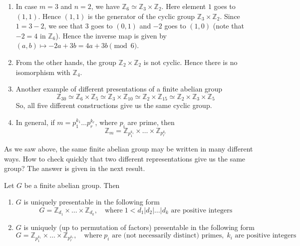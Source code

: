 \begin{examples}
\begin{enumerate}
\item In case $m = 3$ and $n = 2$, we have $\mathbb Z_6\simeq \mathbb Z_3\times\mathbb Z_2$.
Here element $1$ goes to $(1, 1)$.
Hence $(1, 1)$ is the generator of the cyclic group $\mathbb Z_3\times \mathbb Z_2$.
Since $1 = 3 - 2$, we see that $3$ goes to $(0, 1)$ and $-2$ goes to $(1,0)$  (note that $- 2 = 4$ in $\mathbb Z_6$).
Hence the inverse map is given by $(a, b)\mapsto -2a + 3b = 4a + 3b\pmod 6$.

\item From the other hands, the group $\mathbb Z_2\times \mathbb Z_2$ is not cyclic.
Hence there is no isomorphism with $\mathbb Z_4$.

\item Another example of different presentations of a finite abelian group
\[
\mathbb Z_{30} \simeq \mathbb Z_6 \times \mathbb Z_5 \simeq \mathbb Z_3 \times\mathbb Z_{10}\simeq\mathbb Z_2 \times \mathbb Z_{15} \simeq\mathbb Z_2\times\mathbb Z_3\times \mathbb Z_5
\]
So, all five different constructions give us the same cyclic group.

\item In general, if $m = p_1^{k_1}\ldots p_r^{k_r}$, where $p_i$ are prime, then
\[
\mathbb Z_{m} = \mathbb Z_{p_1^{k_1}}\times \ldots \times \mathbb Z_{p_r^{k_r}}
\]
\end{enumerate}
\end{examples}

As we saw above, the same finite abelian group may be written in many different ways.
How to check quickly that two different representations give us the same group?
The answer is given in the next result.

\begin{claim}
\label{claim::FAGClass}
Let $G$ be a finite abelian group.
Then
\begin{enumerate}
\item $G$ is uniquely presentable in the following form
\[
G = \mathbb Z_{d_1}\times \ldots \times \mathbb Z_{d_k},\quad\text{where}\; 1 < d_1|d_2|\ldots|d_k\text{ are positive integers}
\]

\item $G$ is uniquely (up to permutation of factors) presentable in the following form
\[
G = \mathbb Z_{p_1^{k_1}}\times \ldots \times \mathbb Z_{p_r^{k_r}},\quad \text{where}\; p_i \text{ are (not necessarily distinct) primes},\; k_i\text{ are positive integers}
\]
\end{enumerate}
\end{claim}

